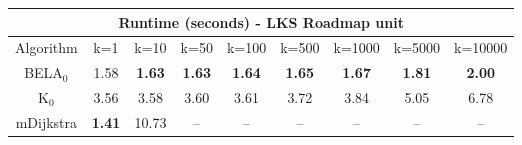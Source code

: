\begin{tabular}{c|cccccccc}\toprule
\multicolumn{9}{c}{Runtime (seconds) - LKS Roadmap unit}\\ \midrule
Algorithm & k=1 & k=10 & k=50 & k=100 & k=500 & k=1000 & k=5000 & k=10000 \\ \midrule
BELA$_0$ & 1.58 & \textbf{1.63} & \textbf{1.63} & \textbf{1.64} & \textbf{1.65} & \textbf{1.67} & \textbf{1.81} & \textbf{2.00} \\
K$_0$ & 3.56 & 3.58 & 3.60 & 3.61 & 3.72 & 3.84 & 5.05 & 6.78 \\
mDijkstra & \textbf{1.41} & 10.73 & -- & -- & -- & -- & -- & -- \\ \bottomrule 
\end{tabular}

